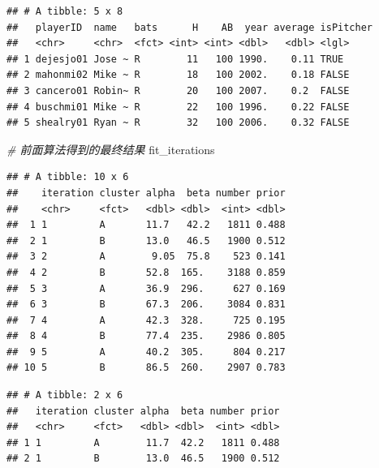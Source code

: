 \documentclass[
]{book}
\newenvironment{Shaded}{\begin{snugshade}}{\end{snugshade}}
\newcommand{\CommentTok}[1]{\textcolor[rgb]{0.56,0.35,0.01}{\textit{#1}}}
\newcommand{\DecValTok}[1]{\textcolor[rgb]{0.00,0.00,0.81}{#1}}
\newcommand{\KeywordTok}[1]{\textcolor[rgb]{0.13,0.29,0.53}{\textbf{#1}}}
\newcommand{\NormalTok}[1]{#1}
\newcommand{\OperatorTok}[1]{\textcolor[rgb]{0.81,0.36,0.00}{\textbf{#1}}}
\newcommand{\StringTok}[1]{\textcolor[rgb]{0.31,0.60,0.02}{#1}}
\begin{document}
\begin{verbatim}
## # A tibble: 5 x 8
##   playerID  name   bats      H    AB  year average isPitcher
##   <chr>     <chr>  <fct> <int> <int> <dbl>   <dbl> <lgl>    
## 1 dejesjo01 Jose ~ R        11   100 1990.    0.11 TRUE     
## 2 mahonmi02 Mike ~ R        18   100 2002.    0.18 FALSE    
## 3 cancero01 Robin~ R        20   100 2007.    0.2  FALSE    
## 4 buschmi01 Mike ~ R        22   100 1996.    0.22 FALSE    
## 5 shealry01 Ryan ~ R        32   100 2006.    0.32 FALSE
\end{verbatim}

\begin{Shaded}
\begin{Highlighting}[]
\CommentTok{# 前面算法得到的最终结果}
\NormalTok{fit_iterations}
\end{Highlighting}
\end{Shaded}

\begin{verbatim}
## # A tibble: 10 x 6
##    iteration cluster alpha  beta number prior
##    <chr>     <fct>   <dbl> <dbl>  <int> <dbl>
##  1 1         A       11.7   42.2   1811 0.488
##  2 1         B       13.0   46.5   1900 0.512
##  3 2         A        9.05  75.8    523 0.141
##  4 2         B       52.8  165.    3188 0.859
##  5 3         A       36.9  296.     627 0.169
##  6 3         B       67.3  206.    3084 0.831
##  7 4         A       42.3  328.     725 0.195
##  8 4         B       77.4  235.    2986 0.805
##  9 5         A       40.2  305.     804 0.217
## 10 5         B       86.5  260.    2907 0.783
\end{verbatim}

\begin{Shaded}
\end{Shaded}

\begin{verbatim}
## # A tibble: 2 x 6
##   iteration cluster alpha  beta number prior
##   <chr>     <fct>   <dbl> <dbl>  <int> <dbl>
## 1 1         A        11.7  42.2   1811 0.488
## 2 1         B        13.0  46.5   1900 0.512
\end{verbatim}
\end{document}
